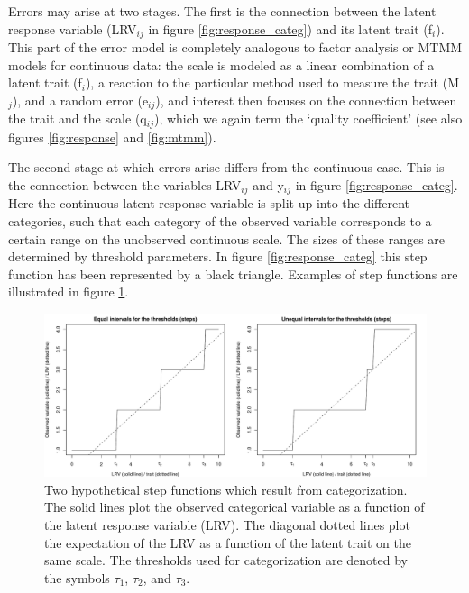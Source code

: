 \documentclass[a4paper,12pt]{article}
\begin{document}
Errors may arise at two stages. The first is the connection between the latent response variable (LRV$_{ij}$ in figure \ref{fig:response_categ}) and its latent trait (f$_i$). This part of the error model is completely analogous to factor analysis or MTMM models for continuous data: the scale is modeled as a linear combination of a latent trait (f$_i$), a reaction to the particular method used to measure the trait (M$_j$), and a random error (e$_{ij}$), and interest then focuses on the connection between the trait and the scale (q$_{ij}$), which we again term the `quality coefficient' (see also figures \ref{fig:response} and \ref{fig:mtmm}). 


The second stage at which errors arise differs from the continuous case. This is the connection between the variables LRV$_{ij}$ and y$_{ij}$ in figure \ref{fig:response_categ}. Here the continuous latent response variable is split up into the different categories, such that each category of the observed variable corresponds to a certain range on the unobserved continuous scale. The sizes of these ranges are determined by threshold parameters. In figure \ref{fig:response_categ} this step function has been represented by a black triangle. Examples of step functions are illustrated in figure \ref{fig:step-function}.

\begin{figure}[htb]\centering \includegraphics[width=\textwidth]{i/step-function} 
\caption{Two hypothetical step functions which result from categorization. The solid lines plot the observed categorical variable as a function of the latent response variable (LRV). The diagonal dotted lines plot the expectation of the LRV as a function of the latent trait on the same scale. The thresholds used for categorization are denoted by the symbols $\tau_1$, $\tau_2$, and $\tau_3$.\label{fig:step-function}} \end{figure}
\end{document}
